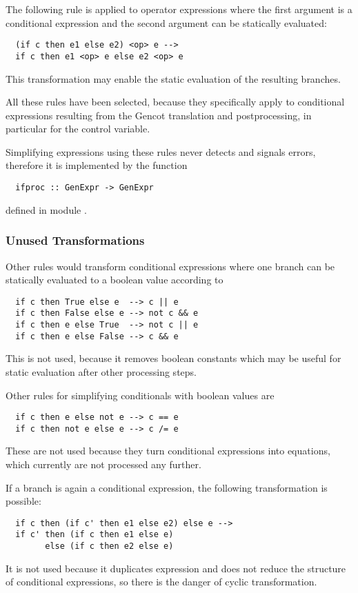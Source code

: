 The following rule is applied to operator expressions where the first argument is a conditional expression and the second argument
can be statically evaluated:
\begin{verbatim}
  (if c then e1 else e2) <op> e -->
  if c then e1 <op> e else e2 <op> e
\end{verbatim}
This transformation may enable the static evaluation of the resulting branches. 

All these rules have been selected, because they specifically apply to conditional expressions resulting from the Gencot translation
and postprocessing, in particular for the control variable.

Simplifying  expressions using these rules never detects and signals errors, therefore it is implemented by the function
\begin{verbatim}
  ifproc :: GenExpr -> GenExpr
\end{verbatim}
defined in module .

\subsubsection{Unused Transformations}

Other rules would transform conditional expressions where one branch can be statically evaluated to a boolean value according to
\begin{verbatim}
  if c then True else e  --> c || e
  if c then False else e --> not c && e
  if c then e else True  --> not c || e
  if c then e else False --> c && e
\end{verbatim}
This is not used, because it removes boolean constants which may be useful for static evaluation after other processing steps.

Other rules for simplifying conditionals with boolean values are
\begin{verbatim}
  if c then e else not e --> c == e
  if c then not e else e --> c /= e
\end{verbatim}
These are not used because they turn conditional expressions into equations, which currently are not processed any further.

If a branch is again a conditional expression, the following transformation is possible:
\begin{verbatim}
  if c then (if c' then e1 else e2) else e -->
  if c' then (if c then e1 else e)
        else (if c then e2 else e)
\end{verbatim}
It is not used because it duplicates expression  and does not reduce the structure of conditional expressions,
so there is the danger of cyclic transformation.

